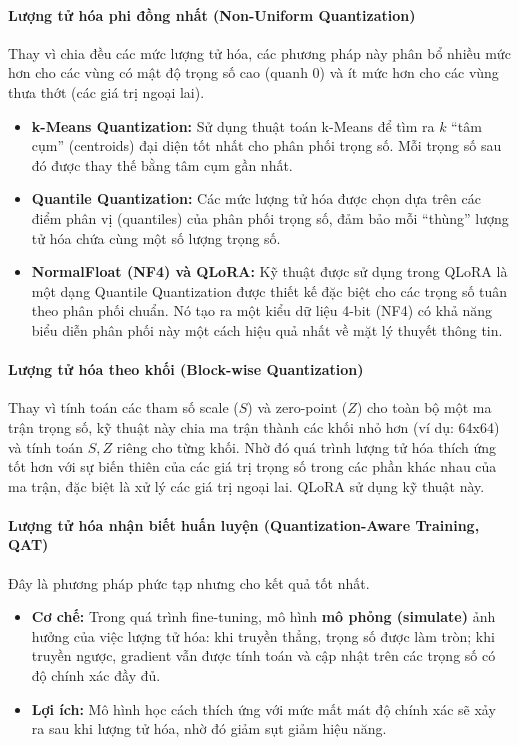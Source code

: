 \paragraph{Lượng tử hóa phi đồng nhất (Non-Uniform Quantization)}
Thay vì chia đều các mức lượng tử hóa, các phương pháp này phân bổ nhiều mức hơn cho các vùng có mật độ trọng số cao (quanh 0) và ít mức hơn cho các vùng thưa thớt (các giá trị ngoại lai).
\begin{itemize}
	\item \textbf{k-Means Quantization:} Sử dụng thuật toán k-Means để tìm ra $k$ “tâm cụm” (centroids) đại diện tốt nhất cho phân phối trọng số. Mỗi trọng số sau đó được thay thế bằng tâm cụm gần nhất.
	\item \textbf{Quantile Quantization:} Các mức lượng tử hóa được chọn dựa trên các điểm phân vị (quantiles) của phân phối trọng số, đảm bảo mỗi “thùng” lượng tử hóa chứa cùng một số lượng trọng số.
	\item \textbf{NormalFloat (NF4) và QLoRA:} Kỹ thuật được sử dụng trong QLoRA là một dạng Quantile Quantization được thiết kế đặc biệt cho các trọng số tuân theo phân phối chuẩn. Nó tạo ra một kiểu dữ liệu 4-bit (NF4) có khả năng biểu diễn phân phối này một cách hiệu quả nhất về mặt lý thuyết thông tin.
\end{itemize}

\paragraph{Lượng tử hóa theo khối (Block-wise Quantization)}
Thay vì tính toán các tham số scale ($S$) và zero-point ($Z$) cho toàn bộ một ma trận trọng số, kỹ thuật này chia ma trận thành các khối nhỏ hơn (ví dụ: 64x64) và tính toán $S, Z$ riêng cho từng khối. Nhờ đó quá trình lượng tử hóa thích ứng tốt hơn với sự biến thiên của các giá trị trọng số trong các phần khác nhau của ma trận, đặc biệt là xử lý các giá trị ngoại lai. QLoRA sử dụng kỹ thuật này.

\paragraph{Lượng tử hóa nhận biết huấn luyện (Quantization-Aware Training, QAT)}
Đây là phương pháp phức tạp nhưng cho kết quả tốt nhất.
\begin{itemize}
	\item \textbf{Cơ chế:} Trong quá trình fine-tuning, mô hình \textbf{mô phỏng (simulate)} ảnh hưởng của việc lượng tử hóa: khi truyền thẳng, trọng số được làm tròn; khi truyền ngược, gradient vẫn được tính toán và cập nhật trên các trọng số có độ chính xác đầy đủ.
	\item \textbf{Lợi ích:} Mô hình học cách thích ứng với mức mất mát độ chính xác sẽ xảy ra sau khi lượng tử hóa, nhờ đó giảm sụt giảm hiệu năng.
\end{itemize}

